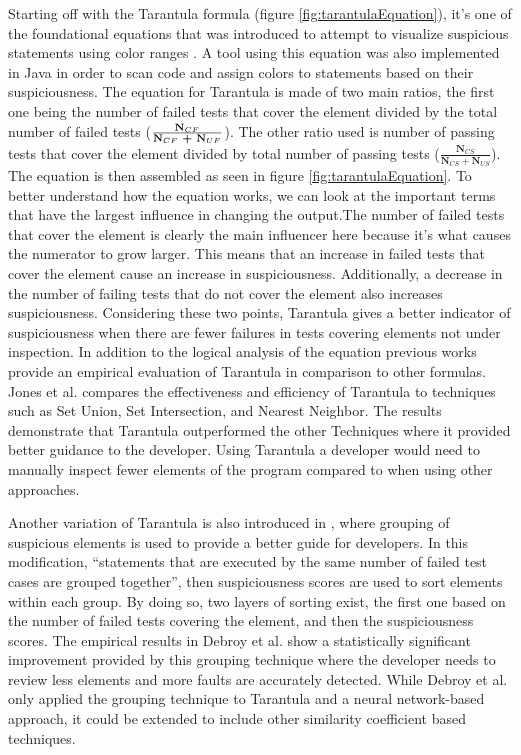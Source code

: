 Starting off with the Tarantula formula (figure \ref{fig:tarantulaEquation}), it's
one of the foundational equations that was introduced to attempt to visualize
suspicious statements using color ranges \cite{jones2002viz,
Jones2005TarantulaEval}. A tool using this equation was also implemented in Java
in order to scan code and assign colors to statements based on their
suspiciousness. The equation for Tarantula is made of two main ratios, the first
one being the number of failed tests that cover the element divided by the total
number of failed tests (\(\frac{\textbf{N$_{CF}$}}{\textbf{N$_{CF}$ +
\textbf{N$_{UF}$}}}\)). The other ratio used is number of passing tests that
cover the element divided by total number of passing tests
(\(\frac{\textbf{N$_{CS}$}}{\textbf{N$_{CS}$}+\textbf{N$_{US}$}}\)).
The equation is then assembled as seen in figure \ref{fig:tarantulaEquation}.
To better understand how the equation works, we can look at the important terms
that have the largest influence in changing the output.The number of failed
tests that cover the element is clearly the main influencer here because it's
what causes the numerator to grow larger. This means that an increase in failed
tests that cover the element cause an increase in suspiciousness. Additionally,
a decrease in the number of failing tests that do not cover the element also
increases suspiciousness. Considering these two points, Tarantula gives a better
indicator of suspiciousness when there are fewer failures in tests covering
elements not under inspection. In addition to the logical analysis of the
equation previous works provide an empirical evaluation of Tarantula in
comparison to other formulas. Jones et al. \cite{Jones2005TarantulaEval}
compares the effectiveness and efficiency of Tarantula to techniques such as Set Union, Set
Intersection, and Nearest Neighbor. The results demonstrate that Tarantula
outperformed the other Techniques where it provided better guidance to the
developer. Using Tarantula a developer would need to manually
inspect fewer elements of the program compared to when using other approaches.

Another variation of Tarantula is also introduced in \cite{debroy2010grouping},
where grouping of suspicious elements is used to provide a better guide for
developers. In this modification, ``statements that are executed by the same
number of failed test cases are grouped together'', then suspiciousness scores
are used to sort elements within each group. By doing so, two layers of sorting
exist, the first one based on the number of failed tests covering the element,
and then the suspiciousness scores. The empirical results in Debroy et al.
\cite{debroy2010grouping} show a statistically significant improvement provided
by this grouping technique where the developer needs to review less elements and
more faults are accurately detected. While Debroy et al. only applied the
grouping technique to Tarantula and a neural network-based approach, it could be
extended to include other similarity coefficient based techniques.

